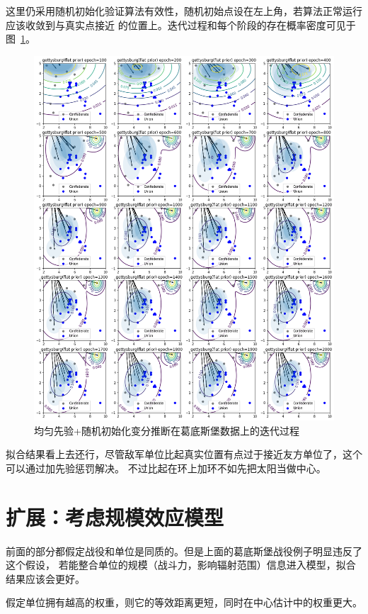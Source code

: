 \documentclass{sicnuthesis}
\begin{document}
这里仍采用随机初始化验证算法有效性，随机初始点设在左上角，若算法正常运行应该收敛到与真实点接近
的位置上。迭代过程和每个阶段的存在概率密度可见于图~\ref{fig:gettysburgInit}。

\begin{figure}[htb]
\includegraphics[width=0.99\linewidth]{gettysburg-init.png}
\caption{
均匀先验+随机初始化变分推断在葛底斯堡数据上的迭代过程}
\label{fig:gettysburgInit}
\end{figure}


拟合结果看上去还行，尽管敌军单位比起真实位置有点过于接近友方单位了，这个可以通过加先验惩罚解决。
不过比起在环上加环不如先把太阳当做中心。


\section{扩展：考虑规模效应模型}


前面的部分都假定战役和单位是同质的。但是上面的葛底斯堡战役例子明显违反了这个假设，
若能整合单位的规模（战斗力，影响辐射范围）信息进入模型，拟合结果应该会更好。

假定单位拥有越高的权重，则它的等效距离更短，同时在中心估计中的权重更大。
\end{document}
